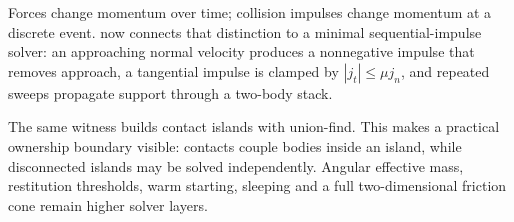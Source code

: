 \hypertarget{appendix-c39931e6e4c2-constraint-level-continuation}{}

Forces change momentum over time; collision impulses change momentum at a discrete event.  now connects that distinction to a minimal sequential-impulse solver: an approaching normal velocity produces a nonnegative impulse that removes approach, a tangential impulse is clamped by \(|j_t|\le\mu j_n\), and repeated sweeps propagate support through a two-body stack.

The same witness builds contact islands with union-find. This makes a practical ownership boundary visible: contacts couple bodies inside an island, while disconnected islands may be solved independently. Angular effective mass, restitution thresholds, warm starting, sleeping and a full two-dimensional friction cone remain higher solver layers.
